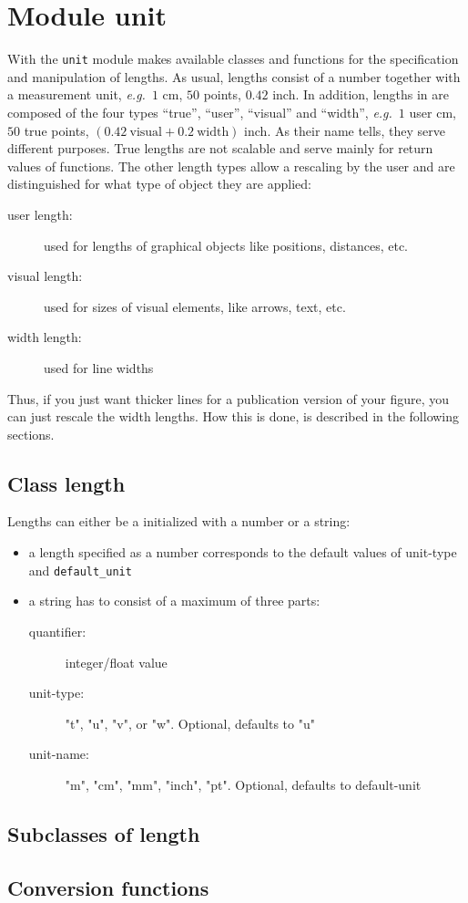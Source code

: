 \chapter{Module unit}
\label{unit}

With the \verb|unit| module \PyX{} makes available classes and
functions for the specification and manipulation of lengths. As usual,
lengths consist of a number together with a measurement unit,
\textit{e.g.}\ $1$ cm, $50$ points, $0.42$ inch.  In addition, lengths
in \PyX{} are composed of the four types ``true'', ``user'',
``visual'' and ``width'', \textit{e.g.}\ $1$ user cm, $50$ true
points, $(0.42\ \mathrm{visual} + 0.2\ \mathrm{width})$ inch.  As
their name tells, they serve different purposes. True lengths are not
scalable and serve mainly for return values of \PyX{} functions.  The
other length types allow a rescaling by the user and are distinguished
for what type of object they are applied:

\begin{description}
\item[user length:] used for lengths of graphical objects like
  positions, distances, etc.
\item[visual length:] used for sizes of visual elements, like arrows,
  text, etc.
\item[width length:] used for line widths
\end{description}

Thus, if you just want thicker lines for a publication version of your
figure, you can just rescale the width lengths. How this is done, is
described in the following sections.

\section{Class length}
Lengths can either be a initialized with a number or a string:
\begin{itemize}
\item a length specified as a number corresponds to the default values of
unit-type and \verb|default_unit|
\item a string has to consist of a maximum of three parts:
\begin{description}
\item[quantifier:] integer/float value
\item[unit-type:] "t", "u", "v", or "w". Optional, defaults to "u"
\item[unit-name:] "m", "cm", "mm", "inch", "pt". Optional, defaults
to default-unit
\end{description}
\end{itemize}

\section{Subclasses of length}

\section{Conversion functions}



